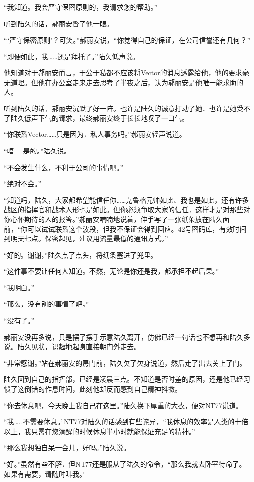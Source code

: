 “我知道。我会严守保密原则的，我请求您的帮助。”

听到陆久的话，郝丽安瞥了他一眼。

“‘严守保密原则’？可笑。”郝丽安说，“你觉得自己的保证，在公司信誉还有几何？”

“即便如此，我……还是拜托了。”陆久低声说。

他知道对于郝丽安而言，于公于私都不应该将Vector的消息透露给他，他的要求毫无道理。但他在办公室走来走去思考了半夜之后，认为郝丽安是他唯一能求助的人。

听到陆久的话，郝丽安沉默了好一阵。也许是陆久的诚意打动了她、也许是她受不了陆久低声下气的请求，最终郝丽安终于长长地叹了一口气。

“你联系Vector……只是因为，私人事务吗。”郝丽安轻声说道。

“唔……是的。”陆久说。

“不会发生什么，不利于公司的事情吧。”

“绝对不会。”

“知道吗，陆久，大家都希望能信任你……克鲁格元帅如此、我也是如此，还有许多战区的指挥官和战术人形也是如此。但你必须争取大家的信任，这样才是对那些对你心怀期待的人的报答。”郝丽安喃喃地说着，伸手写了一张纸条放在陆久面前，“你可以试试联系这个波段，但我不保证会得到回应。42号密码库，有效时间到明天七点。保密起见，建议用流量最低的通讯方式。”

“好的。谢谢。”陆久点了点头，将纸条塞进了兜里。

“这件事不要让任何人知道。不然，无论是你还是我，都承担不起后果。”

“我明白。”

“那么，没有别的事情了吧。”

“没有了。”

郝丽安没再多说，只是摆了摆手示意陆久离开，仿佛已经一句话也不想再和陆久多说。陆久见状，识趣地起身直接朝门外走去。

“非常感谢。”站在郝丽安的房门前，陆久欠了欠身说道，然后走了出去关上了门。

陆久回到自己的指挥部，已经是凌晨三点。不知道是否时差的原因，还是他已经习惯了这倒错的作息时间，此刻他却反而感到自己精神抖擞。

“你去休息吧，今天晚上我自己在这里。”陆久换下厚重的大衣，便对NT77说道。

“我……不需要休息。”NT77对陆久的话感到有些诧异，“我休息的效率是人类的十倍以上，我只需在您清醒的时候休息半小时就能保证充足的精神。”

“那么我想独自呆一会儿，好吗。”陆久说。

“好。”虽然有些不解，但NT77还是服从了陆久的命令，“那么我就去卧室待命了。如果有需要，请随时叫我。”

